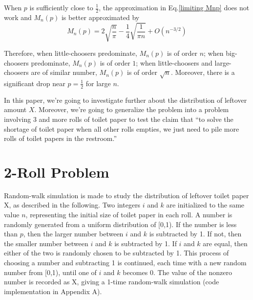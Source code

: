 \documentclass{article}
\begin{document}
When $p$ is sufficiently close to $\frac{1}{2}$, the approximation in Eq.\eqref{limiting Mnp} does not work and $M_n(p)$ is better approximated by 
\begin{equation}
    M_n(p)=
    2\sqrt{\frac{n}{\pi}} - \frac{1}{4} \sqrt{\frac{1}{\pi n}} + O(n^{-3/2})
    \label{limiting Mnp equal}
\end{equation}

Therefore, when little-choosers predominate, $M_n(p)$ is of order $n$; when big-choosers predominate, $M_n(p)$ is of order $1$; when little-choosers and large-choosers are of similar number, $M_n(p)$ is of order $\sqrt{n}$. Moreover, there is a significant drop near $p=\frac{1}{2}$ for large $n$. 

In this paper, we're going to investigate further about the distribution of leftover amount $X$. Moreover, we're going to generalize the problem into a problem involving 3 and more rolls of toilet paper to test the claim that ``to solve the shortage of toilet paper when all other rolls empties, we just need to pile more rolls of toilet papers in the restroom.''
\section{2-Roll Problem}
Random-walk simulation is made to study the distribution of leftover toilet paper X, as described in the following. Two integers $i$ and $k$ are initialized to the same value $n$, representing the initial size of toilet paper in each roll. A number is randomly generated from a uniform distribution of [0,1). If the number is less than $p$, then the larger number between $i$ and $k$ is subtracted by 1. If not, then the smaller number between $i$ and $k$ is subtracted by 1. If $i$ and $k$ are equal, then either of the two is randomly chosen to be subtracted by 1. This process of choosing a number and subtracting 1 is continued, each time with a new random number from [0,1), until one of $i$ and $k$ becomes 0. The value of the nonzero number is recorded as X, giving a 1-time random-walk simulation (code implementation in Appendix A). 
\end{document}
